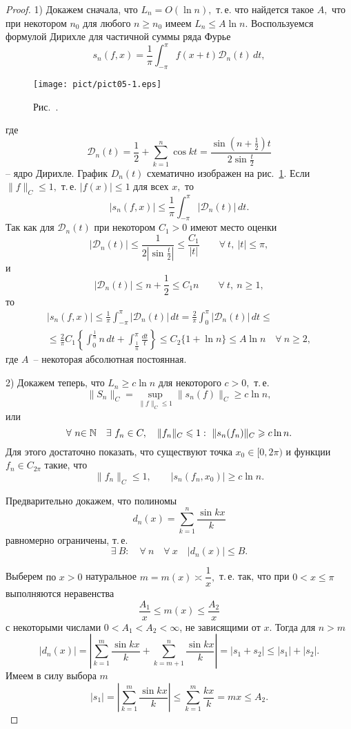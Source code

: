 \begin{proof}
1) Докажем сначала, что $L_n=O(\ln n),$ т.\,е. что найдется такое $A,$ что при некотором
$n_0$ для любого $n\ge n_0$ имеем $L_n\le A\ln n.$ Воспользуемся формулой Дирихле для
частичной суммы ряда Фурье
$$
s_n(f,x)=\frac{1}{\pi}\int_{-\pi}^{\pi} f(x+t) \mathcal D_n(t)\, dt,
$$
\begin{figure}[ht]
\begin{center}
\texttt{[image: pict/pict05-1.eps]}
\end{center}
 \bigskip
 \label{r5-1}

 \centerline{Рис.~\theris. }
 \bigskip
\end{figure}
где
$$
\mathcal D_n(t)=\frac12+\sum\limits_{k=1}^n \cos kt=\frac{\sin\left( n+\frac12
\right)t}{2\sin \frac{t}{2}}
$$
-- ядро Дирихле. График $D_n(t)$ схематично изображен на рис.~\ref{r5-1}. Если $\|f\|_C\le 1,$ т.\,е. $|f(x)|\le 1$ для
всех $x,$ то
$$
|s_n(f,x)|\le \frac{1}{\pi} \int_{-\pi}^{\pi} |\mathcal D_n(t)|\, dt.
$$
Так как для $\mathcal D_n(t)$ при некотором {$C_1>0$} имеют
место оценки
$$
|\mathcal D_n(t)|\le \frac{1}{2\left|\sin \frac{t}{2}\right|}\le \frac{C_{{1}}}{|t|}
\qquad \forall\ t,~ |t|\le \pi,
$$
и
$$
|\mathcal D_n(t)|\le n+\frac{1}{2} \le C_{{1}}n\qquad \forall\ t{,~ n\ge1},
$$
то
\begin{multline*}
|s_n(f,x)|\le \frac{1}{\pi} \int_{-\pi}^{\pi} |\mathcal
D_n(t)|\, dt
{=\frac{2}{\pi}\int_{0}^{\pi} |\mathcal D_n(t)|\,dt}\le \\
\le {\frac{2}{\pi}C_1}\left\{ \int_{0}^{\frac{1}{n}} n\, dt +
\int_{\frac{1}{n}}^{\pi} \frac{dt}{t}\right\}\le C_2\{ 1+\ln n\}\le {A} \ln n\quad
\forall\ n\ge {2},
\end{multline*}
где $A$~-- некоторая абсолютная постоянная.

2) Докажем теперь, что $L_n\ge c\ln n$ для некоторого $c>0,$
т.\,е.
$$
\|{S}_n\|_C=\sup_{\|f\|_C\le 1} \|s_n(f)\|_C\ge c\ln n,
$$
или
$$
\forall\ n{\in\mathbb{N}}\quad \exists\ f_n\in C,\quad \|f_n\|_C\leqslant 1:\ \|s_n(f_n)\|_C\geqslant c\ln n.
$$
Для этого достаточно показать, что существуют точка $x_0\in [0, 2\pi)$ и функции {$f_n \in C_{2\pi}$}
 такие, что
$$
\|f_n\|_C\le 1,\qquad |s_n(f_n,x_0)|\ge c\ln n.
$$

Предварительно докажем, что полиномы
$$
d_n(x)=\sum\limits_{k=1}^n \frac{\sin kx}{k}
$$
равномерно ограничены, т.\,е.
$$
\exists\ {B}:\quad \forall\ n\quad \forall\ x\quad |d_n(x)|\le {B}.
$$

Выберем {по $x>0$} натуральное $m=m(x)\asymp \dfrac{1}{x},$ т.\,е. так, что
при $0< x\le \pi$ выполняются неравенства
$$
\frac{A_1}{x}\le m(x)\le\frac{A_2}{x}
$$
с некоторыми числами $0<A_1<A_2<\infty$, не зависящими от $x$.  Тогда для $n>m$
$$
|d_n(x)|=\left| \sum\limits_{k=1}^m \frac{\sin kx}{k}+
\sum\limits_{k=m+1}^n \frac{\sin kx}{k}\right|=|s_1+s_2|\le |s_1|+|s_2|.
$$
Имеем в силу выбора $m$
$$
|s_1|=\left| \sum\limits_{k=1}^m \frac{\sin kx}{k} \right|\le \sum\limits_{k=1}^m
\frac{kx}{k}=mx\le {A_2}.
$$



\end{proof}

